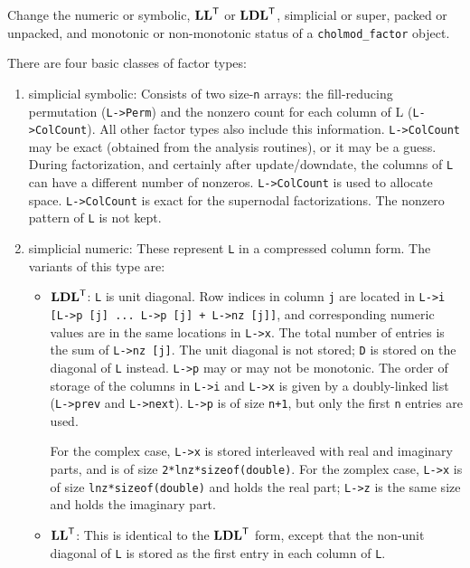 \documentclass[11pt]{article}
\newcommand{\m}[1]{{\bf{#1}}}       %
\newcommand{\tr}{^{\sf T}}          %
\begin{document}

Change the numeric or symbolic, $\m{LL}\tr$ or $\m{LDL}\tr$, simplicial or super, packed or unpacked, and
monotonic or non-monotonic status of a {\tt cholmod\_factor} object.

There are four basic classes of factor types:
\begin{enumerate}
\item simplicial symbolic:  Consists of two size-{\tt n} arrays: the fill-reducing
permutation ({\tt L->Perm}) and the nonzero count for each column of L
({\tt L->ColCount}).  All other factor types also include this information.
{\tt L->ColCount} may be exact (obtained from the analysis routines), or
it may be a guess.  During factorization, and certainly after update/downdate,
the columns of {\tt L} can have a different number of nonzeros.
{\tt L->ColCount} is used to allocate space.  {\tt L->ColCount} is exact for the
supernodal factorizations.  The nonzero pattern of {\tt L} is not kept.

\item simplicial numeric:  These represent {\tt L} in a compressed column form.  The
variants of this type are:

\begin{itemize}
\item $\m{LDL}\tr$:	{\tt L} is unit diagonal.  Row indices in column {\tt j} are located in
    {\tt L->i [L->p [j] ... L->p [j] + L->nz [j]]}, and corresponding numeric
    values are in the same locations in {\tt L->x}.  The total number of
    entries is the sum of {\tt L->nz [j]}.  The unit diagonal is not stored;
    {\tt D} is stored on the diagonal of {\tt L} instead.  {\tt L->p} may or may not be
    monotonic.  The order of storage of the columns in {\tt L->i} and {\tt L->x} is
    given by a doubly-linked list ({\tt L->prev} and {\tt L->next}).  {\tt L->p} is of
    size {\tt n+1}, but only the first {\tt n} entries are used.

    For the complex case, {\tt L->x} is stored interleaved with real and imaginary
    parts, and is of size {\tt 2*lnz*sizeof(double)}.  For the zomplex case,
    {\tt L->x} is of size {\tt lnz*sizeof(double)} and holds the real part; {\tt L->z}
    is the same size and holds the imaginary part.

\item $\m{LL}\tr$:  This is identical to the $\m{LDL}\tr$ form, except that the non-unit
    diagonal of {\tt L} is stored as the first entry in each column of {\tt L}.
\end{itemize}


\end{enumerate}
\end{document}
